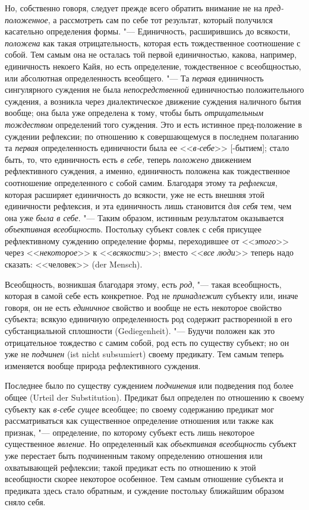 {Но, собственно говоря, следует прежде всего обратить внимание
не на {\em пред-положенное},
а рассмотреть сам по себе тот результат, который получился
касательно определения формы. "--- Единичность, расширившись до
всякости, {\em положена}
как такая отрицательность, которая есть тождественное
соотношение с собой. Тем самым она не осталась той первой единичностью,
какова, например, единичность некоего Кайя, но есть определение,
тождественное с всеобщностью, или абсолютная определенность всеобщего. "---
Та {\em первая}
единичность сингулярного суждения не была
{\em непосредственной}
единичностью положительного суждения, а возникла через
диалектическое движение суждения наличного бытия вообще; она была уже
определена к тому, чтобы быть
{\em отрицательным тождеством}
определений того суждения. Это и есть истинное пред-положение
в суждении рефлексии; по отношению к совершающемуся в последнем полаганию
та {\em первая}
определенность единичности была ее
<<{\em в-себе}>> [-бытием];
стало быть, то, что единичность есть
{\em в себе}, теперь
{\em положено} движением
рефлективного суждения, а именно, единичность положена как тождественное
соотношение определенного с собой самим. Благодаря этому та
{\em рефлексия}, которая
расширяет единичность до всякости, уже не есть внешняя этой единичности
рефлексия, и эта единичность лишь становится
{\em для себя} тем, чем
она уже {\em была в себе}. "---
Таким образом, истинным результатом оказывается
{\em объективная всеобщность}.
Постольку субъект совлек с себя присущее рефлективному
суждению определение формы, переходившее от
<<{\em этого}>> через
<<{\em некоторое}>> к
<<{\em всякости}>>; вместо
<<{\em все люди}>> теперь
надо сказать: <<человек>> (der Mensch).

Всеобщность, возникшая благодаря этому, есть
{\em род}, "--- такая
всеобщность, которая в самой себе есть конкретное. Род не
{\em принадлежит}
субъекту или, иначе говоря, он не есть
{\em единичное} свойство
и вообще не есть некоторое свойство субъекта; всякую единичную
определенность род содержит растворенной в его субстанциальной сплошности
(Gediegenheit). "--- Будучи положен как это отрицательное
тождество с самим собой, род есть по существу субъект; но он уже не
{\em подчинен} (ist nicht subsumiert)
своему предикату. Тем самым теперь изменяется вообще природа
рефлективного суждения.

Последнее было по существу суждением
{\em подчинения} или
подведения под более общее (Urteil der Substitution).
Предикат был определен по отношению к своему субъекту как
{\em в-себе сущее}
всеобщее; по своему содержанию предикат мог рассматриваться
как существенное определение отношения или также как признак, "---
определение, по которому субъект есть лишь некоторое
существенное {\em явление}.
Но определенный как
{\em объективная всеобщность}
субъект уже перестает быть подчиненным такому определению
отношения или охватывающей рефлексии; такой предикат есть по отношению к
этой всеобщности скорее некоторое особенное. Тем самым отношение субъекта и
предиката здесь стало обратным, и суждение постольку ближайшим образом
сняло себя.

}
